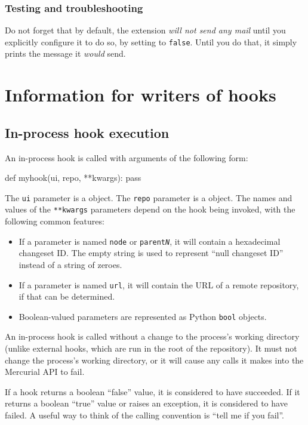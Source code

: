 \subsubsection{Testing and troubleshooting}

Do not forget that by default, the  extension \emph{will
  not send any mail} until you explicitly configure it to do so, by
setting  to \texttt{false}.  Until you do that,
it simply prints the message it \emph{would} send.

\section{Information for writers of hooks}
\label{sec:hook:ref}

\subsection{In-process hook execution}

An in-process hook is called with arguments of the following form:
\begin{codesample2}
  def myhook(ui, repo, **kwargs):
      pass
\end{codesample2}
The \texttt{ui} parameter is a  object.
The \texttt{repo} parameter is a
 object.  The
names and values of the \texttt{**kwargs} parameters depend on the
hook being invoked, with the following common features:
\begin{itemize}
\item If a parameter is named \texttt{node} or
  \texttt{parent\emph{N}}, it will contain a hexadecimal changeset ID.
  The empty string is used to represent ``null changeset ID'' instead
  of a string of zeroes.
\item If a parameter is named \texttt{url}, it will contain the URL of
  a remote repository, if that can be determined.
\item Boolean-valued parameters are represented as Python
  \texttt{bool} objects.
\end{itemize}

An in-process hook is called without a change to the process's working
directory (unlike external hooks, which are run in the root of the
repository).  It must not change the process's working directory, or
it will cause any calls it makes into the Mercurial API to fail.

If a hook returns a boolean ``false'' value, it is considered to have
succeeded.  If it returns a boolean ``true'' value or raises an
exception, it is considered to have failed.  A useful way to think of
the calling convention is ``tell me if you fail''.

